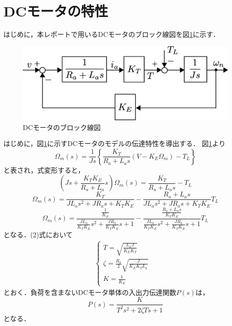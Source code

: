 \documentclass[a4paper,12pt]{jarticle}
\begin{document}
\section{DCモータの特性}
はじめに，本レポートで用いるDCモータのブロック線図を図\ref{fig:DC_model}に示す．
%
\begin{figure}[bp]
 \begin{center}
  \includegraphics[width = 150mm]{fig/DC_model.eps}
 \end{center}
 \caption{DCモータのブロック線図}
 \label{fig:DC_model}
\end{figure}
%
\newpage
%
はじめに，図\ref{fig:DC_model}に示すDCモータのモデルの伝達特性を導出する．
図\ref{fig:DC_model}より
%
\begin{equation}
 \Omega_m(s)=\frac{1}{Js}\left\{\frac{K_T}{R_{a}+L_{a}s}(V-K_E\Omega_m)-T_L\right\}
\end{equation}
と表され，式変形すると，
\begin{equation*}
 \left(Js+\frac{K_{T}K_{E}}{R_{a}+L_{a}}s\right)\Omega_m(s)=\frac{K_{T}}{R_{a}+L_{a}s}-T_L
\end{equation*}
%
\begin{equation*}
 \Omega_m(s)=\frac{K_T}{JL_{a}s^2+JR_{a}s+K_TK_E}-\frac{R_{a}+L_{a}s}{JL_{a}s^2+JR_{a}s+K_TK_E}T_L
\end{equation*}
%
\begin{equation}
 \Omega_m(s)=\frac{\frac{1}{K_E}}{\frac{JL_a}{K_{T}K_E}s^2+\frac{JR_a}{K_{T}K_E}s+1}-\frac{\frac{R_{a}+L_{a}s}{K_{T}K_E}}{\frac{JL_a}{K_{T}K_E}s^2+\frac{JR_a}{K_{T}K_E}s+1}T_L
\end{equation}
%
となる．(2)式において
\begin{eqnarray}
 \begin{cases}
  T = \sqrt{\frac{L_{a}J}{K_{E}K_T}} & \\
  \zeta= \frac{R_a}{2}\sqrt{\frac{J}{K_{E}K_{T}L_a}} & \\
  K = \frac{1}{K_E}
 \end{cases}
\end{eqnarray}
とおく．負荷を含まないDCモータ単体の入出力伝達関数$P(s)$は，
\begin{equation}\label{equ:plant}
 P(s)=\frac{K}{T^2s^2+2\zeta Ts+1}
\end{equation}
となる．
%
\end{document}
